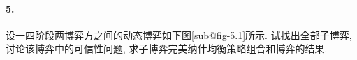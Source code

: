 \documentclass[12pt, a4paper, oneside]{ctexart}
\begin{document}
\paragraph{5.}设一四阶段两博弈方之间的动态博弈如下图\ref{sub@fig-5.1}所示. 试找出全部子博弈, 讨论该博弈中的可信性问题, 求子博弈完美纳什均衡策略组合和博弈的结果.
\begin{figure}[htbp]
    \centering
    \subfigure[] {
        \label{fig-5.2}
        \begin{minipage}[b]{.45\linewidth}
            \centering

\end{minipage}}
\end{figure}
\end{document}
